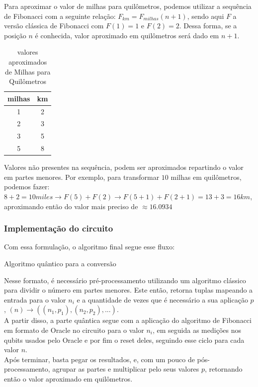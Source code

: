 \documentclass{article}
\begin{document}
Para aproximar o valor de milhas para quilômetros, podemos utilizar a sequência de Fibonacci com a seguinte relação: $F_{km} = F_{milhas}(n+1)$, sendo aqui $F$ a versão clássica de Fibonacci com $F(1) = 1$ e $F(2) = 2$. Dessa forma, se a posição $n$ é conhecida, valor aproximado em quilômetros será dado em $n+1$.


\begin{table}[!h]
	\begin{center}
		\begin{tabular}{ |c|c| } 
			\hline
			milhas & km \\
			\hline
			1 & 2 \\
			\hline
			2 & 3 \\
			\hline
			3 & 5 \\
			\hline
			5 & 8 \\
			\hline
		\end{tabular}
	\caption{valores aproximados de Milhas para Quilômetros}
	\end{center}
\end{table}

Valores não presentes na sequência, podem ser aproximados repartindo o valor em partes menores. Por exemplo, para transformar $10$ milhas em quilômetros, podemos fazer: $8 + 2 = 10miles \to F(5) + F(2) \to F(5+1) + F(2+1) =  13 + 3 = 16km$, aproximando então do valor mais preciso de $\approx 16.0934$


\subsubsection{Implementação do circuito}
Com essa formulação, o algoritmo final segue esse fluxo:

\begin{algorithm}[H]
	\begin{algorithmic}
		\EndFor
			
	\end{algorithmic}
	\caption{Algoritmo quântico para a conversão}
	\label{alg:miles-to-km-quantum-algortihm}
\end{algorithm}


Nesse formato, é necessário pré-processamento utilizando um algoritmo clássico para dividir o número em partes menores. Este então, retorna tuplas mapeando a entrada para o valor $n_i$ e a quantidade de vezes que é necessário a sua aplicação $p$, $(n) \to ((n_1, p_1), (n_2, p_2), ...)$.\\
A partir disso, a parte quântica segue com a aplicação do algoritmo de Fibonacci em formato de Oracle no circuito para o valor $n_i$, em seguida as medições nos qubits usados pelo Oracle e por fim o reset deles, seguindo esse ciclo para cada valor $n$.\\
Após terminar, basta pegar os resultados, e, com um pouco de pós-processamento, agrupar as partes e multiplicar pelo seus valores $p$, retornando então o valor aproximado em quilômetros.
\end{document}
